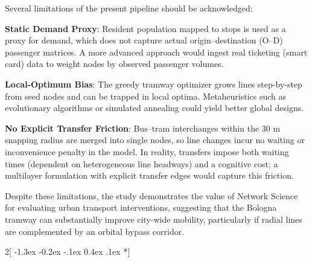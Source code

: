 \documentclass[12pt, a4paper]{article}
\makeatletter
\renewcommand\section{\@startsection {section}{1}{\z@}%
                                   {-1.3ex \@plus -0.2ex \@minus -.1ex}%
                                   {0.4ex \@plus.1ex}%
                                   {\normalfont\Large\bfseries}}
\let\oldenumerate\enumerate
\let\endoldenumerate\endenumerate
\renewenvironment{enumerate}{\oldenumerate\setlength{\itemsep}{0pt}\setlength{\parskip}{0pt}\setlength{\parsep}{0pt}\setlength{\topsep}{0pt}\setlength{\partopsep}{0pt}}{\endoldenumerate}
\makeatother
\begin{document}
Several limitations of the present pipeline should be acknowledged:
\begin{enumerate}\itemsep=0pt\parsep=0pt
    \item \textbf{Static Demand Proxy}: Resident population mapped to stops is used as a proxy for demand, which does not capture actual origin--destination (O--D) passenger matrices. A more advanced approach would ingest real ticketing (smart card) data to weight nodes by observed passenger volumes.
    \item \textbf{Local-Optimum Bias}: The greedy tramway optimizer grows lines step-by-step from seed nodes and can be trapped in local optima. Metaheuristics such as evolutionary algorithms or simulated annealing could yield better global designs.
    \item \textbf{No Explicit Transfer Friction}: Bus--tram interchanges within the $30\text{ m}$ snapping radius are merged into single nodes, so line changes incur no waiting or inconvenience penalty in the model. In reality, transfers impose both waiting times (dependent on heterogeneous line headways) and a cognitive cost; a multilayer formulation with explicit transfer edges would capture this friction.
\end{enumerate}

Despite these limitations, the study demonstrates the value of Network Science for evaluating urban transport interventions, suggesting that the Bologna tramway can substantially improve city-wide mobility, particularly if radial lines are complemented by an orbital bypass corridor.

\begin{multicols}{2}[\vspace{-0.5em}\section*{\refname}\vspace{-0.3em}]
\makeatletter
\renewcommand{\section}[2]{}
\makeatother
\scriptsize\raggedright


\end{multicols}
\end{document}

